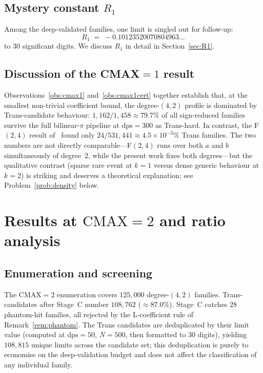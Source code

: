 \documentclass[11pt,a4paper]{amsart}
\theoremstyle{definition}
\theoremstyle{remark}
\newcommand{\dps}{\mathrm{dps}}
\begin{document}
\subsection{Mystery constant $R_1$}

Among the deep-validated families, one limit is singled out for
follow-up:
\[
  R_1 \;=\; -0.10123520070804963\ldots
\]
to $30$ significant digits.  We discuss $R_1$ in detail in
Section~\ref{sec:R1}.

\subsection{Discussion of the CMAX$=1$ result}

Observations~\ref{obs:cmax1} and~\ref{obs:cmax1cert} together
establish that, at the smallest non-trivial coefficient bound, the
degree-$(4,2)$ profile is dominated by Trans-candidate behaviour:
$1{,}162/1{,}458 \approx 79.7\%$ of all sign-reduced families survive
the full bilinear-$\pi$ pipeline at $\dps=300$ as Trans-hard.  In
contrast, the F$(2,4)$ result of~\cite{PCF24} found only
$24/531{,}441 \approx 4.5 \times 10^{-3}\%$ Trans families.  The
two numbers are not directly comparable---F$(2,4)$ runs over
both $a$ and $b$ simultaneously of degree~$2$, while the present work
fixes both degrees---but the qualitative contrast (sparse rare event
at $k=1$ versus dense generic behaviour at $k=2$) is striking and
deserves a theoretical explanation; see Problem~\ref{prob:density}
below.

\section{Results at $\mathrm{CMAX}=2$ and ratio analysis}\label{sec:cmax2}

\subsection{Enumeration and screening}

The $\mathrm{CMAX}=2$ enumeration covers $125{,}000$ degree-$(4,2)$
families.  Trans-candidates after Stage~C number $108{,}762$ ($\approx
87.0\%$).  Stage~C catches $28$ phantom-hit families, all rejected by
the L-coefficient rule of Remark~\ref{rem:phantom}.  The Trans
candidates are deduplicated by their limit value (computed at
$\dps=50$, $N=500$, then formatted to $30$ digits), yielding $108{,}815$
unique limits across the candidate set; this deduplication is purely
to economise on the deep-validation budget and does not affect the
classification of any individual family.
\end{document}
